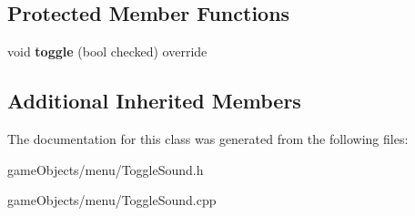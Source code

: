 \subsection*{Protected Member Functions}
\begin{DoxyCompactItemize}
\item 
\hypertarget{class_toggle_sound_a025f34ed217a54cd7e1a8d579a46e496}{void {\bfseries toggle} (bool checked) override}\label{class_toggle_sound_a025f34ed217a54cd7e1a8d579a46e496}

\end{DoxyCompactItemize}
\subsection*{Additional Inherited Members}


The documentation for this class was generated from the following files\+:\begin{DoxyCompactItemize}
\item 
game\+Objects/menu/Toggle\+Sound.\+h\item 
game\+Objects/menu/Toggle\+Sound.\+cpp\end{DoxyCompactItemize}
